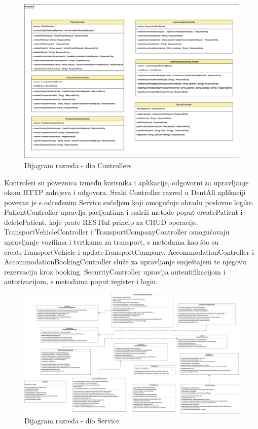 						
			\begin{figure}[H]
				\includegraphics[scale=0.07]{slike/arhitektura_controller_class_diagram_v2.png} %
				\centering
				\caption{Dijagram razreda - dio Controllers}
				\label{fig:arhitektura_controller_class_diagram}
			\end{figure}
			
			Kontroleri su poveznica između korisnika i aplikacije, odgovorni za upravljanje okom HTTP zahtjeva i odgovora. Svaki Controller razred u DentAll aplikaciji povezan je s određenim Service sučeljem koji omogućuje obradu poslovne logike. PatientController upravlja pacijentima i sadrži metode poput createPatient i deletePatient, koje prate RESTful princip za CRUD operacije. TransportVehicleController i TransportCompanyController omogućavaju upravljanje vozilima i tvrtkama za transport, s metodama kao što su createTransportVehicle i updateTransportCompany. AccommodationController i AccommodationBookingController služe za upravljanje smještajem te njegovu rezervaciju kroz booking. SecurityController upravlja autentifikacijom i autorizacijom, s metodama poput register i login.
			
			\begin{figure}[H]
				\includegraphics[scale=0.05]{slike/arhitektura_service_class_diagram.png} %
				\centering
				\caption{Dijagram razreda - dio Service}
				\label{fig:arhitektura_service_class_diagram}
			\end{figure}
			
